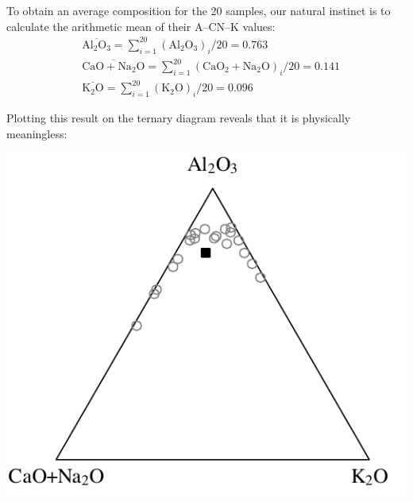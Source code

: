 To obtain an average composition for the 20 samples, our natural
instinct is to calculate the arithmetic mean of their A--CN--K values:
\[
\begin{split}
  &\overline{\mbox{Al}_2\mbox{O}_3} =
  \sum\limits_{i=1}^{20} (\mbox{Al}_2\mbox{O}_3)_i/20 = 0.763 \\
  &\overline{\mbox{CaO} + \mbox{Na}_2\mbox{O}} =
  \sum\limits_{i=1}^{20} (\mbox{CaO}_2+\mbox{Na}_2\mbox{O})_i/20 = 0.141 \\
  &\overline{\mbox{K}_2\mbox{O}} =
  \sum\limits_{i=1}^{20} (\mbox{K}_2\mbox{O})_i/20 = 0.096
\end{split}
\]

Plotting this result on the ternary diagram reveals that it is
physically meaningless:

\noindent\begin{minipage}[t][][b]{.4\textwidth}
\includegraphics[width=\textwidth]{../figures/ACNKarithmeticmean.pdf}\medskip
\end{minipage}
\begin{minipage}[t][][t]{.6\textwidth}
  \label{fig:ACNKarithmeticmean}
\end{minipage}

